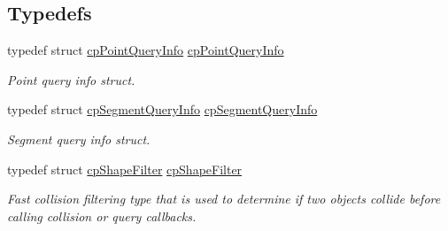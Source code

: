 \subsection*{Typedefs}
\begin{DoxyCompactItemize}
\item 
\mbox{\label{group__cp_shape_ga2264ed925aee1f67a414ff773bfe33ff}} 
typedef struct \mbox{\hyperlink{structcp_point_query_info}{cp\+Point\+Query\+Info}} \mbox{\hyperlink{group__cp_shape_ga2264ed925aee1f67a414ff773bfe33ff}{cp\+Point\+Query\+Info}}
\begin{DoxyCompactList}\small\item\em Point query info struct. \end{DoxyCompactList}\item 
\mbox{\label{group__cp_shape_gadebeb6b5e42d369df368fd220aacd7e8}} 
typedef struct \mbox{\hyperlink{structcp_segment_query_info}{cp\+Segment\+Query\+Info}} \mbox{\hyperlink{group__cp_shape_gadebeb6b5e42d369df368fd220aacd7e8}{cp\+Segment\+Query\+Info}}
\begin{DoxyCompactList}\small\item\em Segment query info struct. \end{DoxyCompactList}\item 
\mbox{\label{group__cp_shape_gaa85aa81b58edce2acc7e06316d11875c}} 
typedef struct \mbox{\hyperlink{structcp_shape_filter}{cp\+Shape\+Filter}} \mbox{\hyperlink{group__cp_shape_gaa85aa81b58edce2acc7e06316d11875c}{cp\+Shape\+Filter}}
\begin{DoxyCompactList}\small\item\em Fast collision filtering type that is used to determine if two objects collide before calling collision or query callbacks. \end{DoxyCompactList}\end{DoxyCompactItemize}
